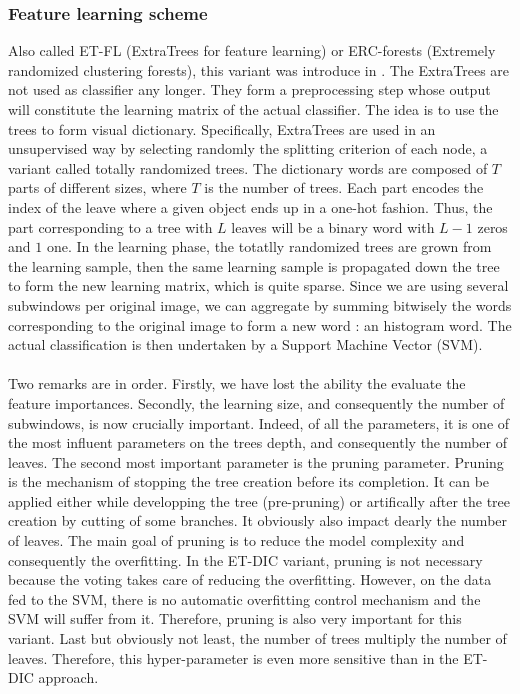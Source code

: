 \documentclass[a4paper]{report}
\begin{document}
			\subsubsection{Feature learning scheme}
			Also called ET-FL (ExtraTrees for feature learning) or ERC-forests (Extremely randomized clustering forests), this variant was introduce in \cite{ETFL}. The ExtraTrees are not used as classifier any longer. They form a preprocessing step whose output will constitute the learning matrix of the actual classifier. The idea is to use the trees to form visual dictionary. Specifically, ExtraTrees are used in an unsupervised way by selecting randomly the splitting criterion of each node, a variant called totally randomized trees. The dictionary words are composed of $T$ parts of different sizes, where $T$ is the number of trees. Each part encodes the index of the leave where a given object ends up in a one-hot fashion. Thus, the part corresponding to a tree with $L$ leaves will be a binary word with $L-1$ zeros and $1$ one. In the learning phase, the totatlly randomized trees are grown from the learning sample, then the same learning sample is propagated down the tree to form the new learning matrix, which is quite sparse. Since we are using several subwindows per original image, we can aggregate by summing bitwisely the words corresponding to the original image to form a new word : an histogram word.
		The actual classification is then undertaken by a Support Machine Vector (SVM). %
		\paragraph{}
		Two remarks are in order. Firstly, we have lost the ability the evaluate the feature importances. Secondly, the learning size, and consequently the number of subwindows, is now crucially important. Indeed, of all the parameters, it is one of the most influent parameters on the trees depth, and consequently the number of leaves. 
		The second most important parameter is the pruning parameter. Pruning is the mechanism of stopping the tree creation before its completion. It can be applied either while developping the tree (pre-pruning) or artifically after the tree creation by cutting of some branches. It obviously also impact dearly the number of leaves. The main goal of pruning is to reduce the model complexity and consequently the overfitting. In the ET-DIC variant, pruning is not necessary because the voting takes care of reducing the overfitting. However, on the data fed to the SVM, there is no automatic overfitting control mechanism and the SVM will suffer from it. Therefore, pruning is also very important for this variant.
		Last but obviously not least, the number of trees multiply the number of leaves. Therefore, this hyper-parameter is even more sensitive than in the ET-DIC approach.
\end{document}
